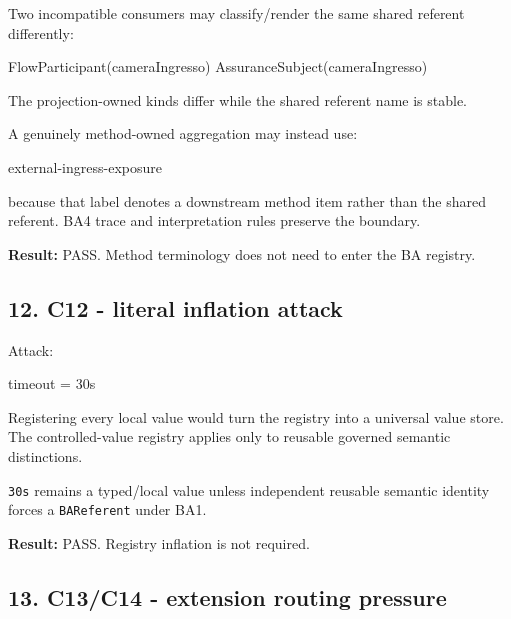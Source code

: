 \documentclass[
  10pt,
  a4paper,
]{article}
\newenvironment{Shaded}{}{}
\newcommand{\NormalTok}[1]{#1}
\begin{document}
Two incompatible consumers may classify/render the same shared referent
differently:

\begin{Shaded}
\begin{Highlighting}[]
\NormalTok{FlowParticipant(cameraIngresso)}
\NormalTok{AssuranceSubject(cameraIngresso)}
\end{Highlighting}
\end{Shaded}

The projection-owned kinds differ while the shared referent name is
stable.

A genuinely method-owned aggregation may instead use:

\begin{Shaded}
\begin{Highlighting}[]
\NormalTok{external{-}ingress{-}exposure}
\end{Highlighting}
\end{Shaded}

because that label denotes a downstream method item rather than the
shared referent. BA4 trace and interpretation rules preserve the
boundary.

\textbf{Result:} PASS. Method terminology does not need to enter the BA
registry.

\subsection{12. C12 - literal inflation
attack}\label{12-c12---literal-inflation-attack}

Attack:

\begin{Shaded}
\begin{Highlighting}[]
\NormalTok{timeout = 30s}
\end{Highlighting}
\end{Shaded}

Registering every local value would turn the registry into a universal
value store. The controlled-value registry applies only to reusable
governed semantic distinctions.

\texttt{30s} remains a typed/local value unless independent reusable
semantic identity forces a \texttt{BAReferent} under BA1.

\textbf{Result:} PASS. Registry inflation is not required.

\subsection{13. C13/C14 - extension routing
pressure}\label{13-c13c14---extension-routing-pressure}
\end{document}
